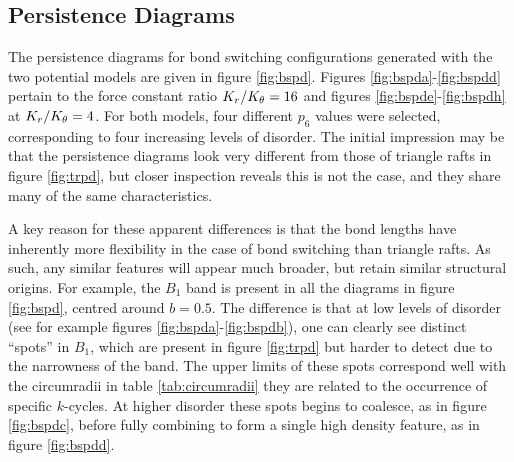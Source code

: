 \subsection{Persistence Diagrams}

The persistence diagrams for bond switching configurations generated with the two potential models are given in figure \ref{fig:bspd}.
Figures \ref{fig:bspda}\--\ref{fig:bspdd} pertain to the force constant ratio $K_r/K_\theta=16$ and figures \ref{fig:bspde}\--\ref{fig:bspdh} at $K_r/K_\theta=4$.
For both models, four different $p_6$ values were selected, corresponding to four increasing levels of disorder.
The initial impression may be that the persistence diagrams look very different from those of triangle rafts in figure \ref{fig:trpd}, but closer inspection reveals this is not the case, and they share many of the same characteristics.

A key reason for these apparent differences is that the bond lengths have inherently more flexibility in the case of bond switching than triangle rafts.
As such, any similar features will appear much broader, but retain similar structural origins.
For example, the $B_1$ band is present in all the diagrams in figure \ref{fig:bspd}, centred around $b=0.5$.
The difference is that at low levels of disorder  (see for example figures \ref{fig:bspda}\--\ref{fig:bspdb}), one can clearly see distinct ``spots'' in $B_1$, which are present in figure \ref{fig:trpd} but harder to detect due to the narrowness of the band.
The upper limits of these spots correspond well with the circumradii in table \ref{tab:circumradii} \ie{} they are related to the occurrence of specific $k$\--cycles.
At higher disorder these spots begins to coalesce, as in figure \ref{fig:bspdc}, before fully combining to form a single high density feature, as in figure \ref{fig:bspdd}.

